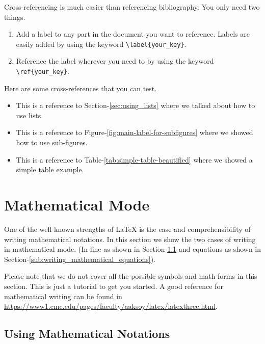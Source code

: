 Cross-referencing is much easier than referencing bibliography. You only need two things.

\begin{enumerate}
    \item Add a label to any part in the document you want to reference. Labels are easily added by using the keyword \verb|\label{your_key}|.
    \item Reference the label wherever you need to by using the keyword \verb|\ref{your_key}|.
\end{enumerate}

Here are some cross-references that you can test.

\begin{itemize}
    \item This is a reference to Section-\ref{sec:using_lists} where we talked about how to use lists. 
    \item This is a reference to Figure-\ref{fig:main-label-for-subfigures} where we showed how to use sub-figures. 
    \item This is a reference to Table-\ref{tab:simple-table-beautified} where we showed a simple table example.
\end{itemize}


\section{Mathematical Mode}
\label{sec:mathematical_mode}

One of the well known strengths of {\LaTeX} is the ease and comprehensibility of writing mathematical notations. In this section we show the two cases of writing in mathematical mode. (In line as shown in Section-\ref{sub:using_mathematical_notations} and equations as shown in Section-\ref{sub:writing_mathematical_equations}).

Please note that we do not cover all the possible symbols and math forms in this section. This is just a tutorial to get you started. A good reference for mathematical writing can be found in \href{https://www1.cmc.edu/pages/faculty/aaksoy/latex/latexthree.html}{https://www1.cmc.edu/pages/faculty/aaksoy/latex/latexthree.html}.


\subsection{Using Mathematical Notations}
\label{sub:using_mathematical_notations}

